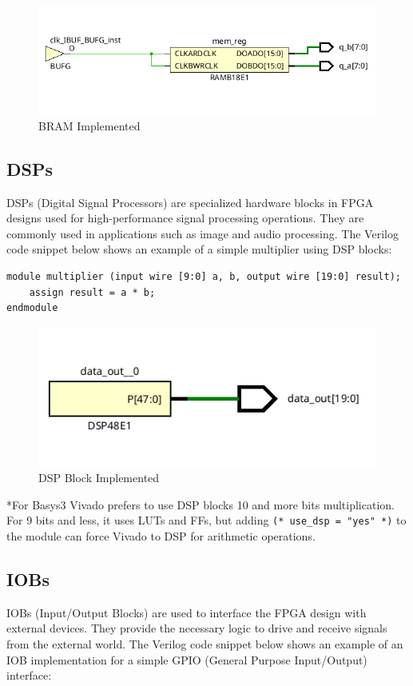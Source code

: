 \documentclass{report}
\begin{document}
\begin{figure}[ht]
    \includegraphics[width=0.6\linewidth]{images/bram.png}
    \centering
    \caption{BRAM Implemented}
    \label{fig:bram}
\end{figure}

\subsection{DSPs}
DSPs (Digital Signal Processors) are specialized hardware blocks in FPGA designs used for high-performance signal processing operations. They are commonly used in applications such as image and audio processing. The Verilog code snippet below shows an example of a simple multiplier using DSP blocks:

\begin{verbatim}
module multiplier (input wire [9:0] a, b, output wire [19:0] result);
    assign result = a * b;
endmodule
\end{verbatim}
\begin{figure}[ht]
    \includegraphics[width=0.6\linewidth]{images/dsp.png}
    \centering
    \caption{DSP Block Implemented}
    \label{fig:dsp}
\end{figure}

*For Basys3 Vivado prefers to use DSP  blocks 10 and more bits multiplication. For 9 bits and less, it uses LUTs and FFs, but adding \texttt{(* use\_dsp = "yes" *)} to the module can force Vivado to DSP for arithmetic operations.

\subsection{IOBs}
IOBs (Input/Output Blocks) are used to interface the FPGA design with external devices. They provide the necessary logic to drive and receive signals from the external world. The Verilog code snippet below shows an example of an IOB implementation for a simple GPIO (General Purpose Input/Output) interface:
\end{document}
